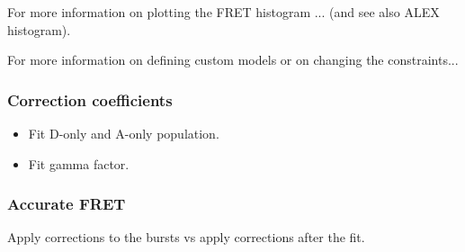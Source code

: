 For more information on plotting the FRET histogram ... (and see also ALEX histogram).

For more information on defining custom models or on changing the constraints...


\subsubsection{Correction coefficients}


\begin{itemize}
\item Fit D-only and A-only population.
\item Fit gamma factor.
\end{itemize}


\subsubsection{Accurate FRET}

Apply corrections to the bursts vs apply corrections after the fit.

